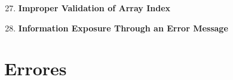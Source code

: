 \documentclass[a4paper,10pt]{article}
\begin{document}
\begin{enumerate}
 \setcounter{enumi}{26}
 \item \textbf{Improper Validation of Array Index}
 \setcounter{enumi}{38}
 \item \textbf{Information Exposure Through an Error Message}
\end{enumerate}

\clearpage
\section{Errores}










\end{document}
